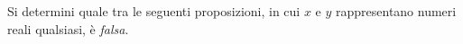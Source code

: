 Si determini quale tra le seguenti proposizioni, 
in cui $x$ e $y$ rappresentano numeri reali qualsiasi, 
è \emph{falsa}. 
